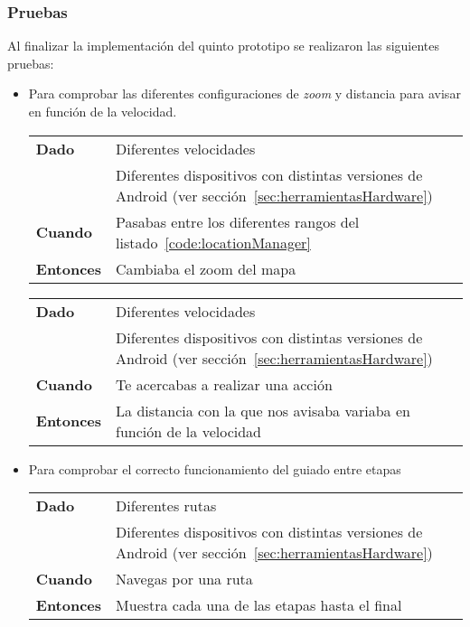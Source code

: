 \subsubsection{Pruebas}

Al finalizar la implementación del quinto prototipo se realizaron las siguientes pruebas:

\begin{itemize}
  \item Para comprobar las diferentes configuraciones de \emph{zoom} y distancia para avisar en
    función de la velocidad.

  \begin{tabular}{p{}p{}}
    \hline
    \textbf{Dado}     & Diferentes velocidades \\
                      & Diferentes dispositivos con distintas versiones de Android (ver
                        sección~\ref{sec:herramientasHardware}) \\
    \textbf{Cuando}   & Pasabas entre los diferentes rangos del listado~\ref{code:locationManager}\\
    \textbf{Entonces} & Cambiaba el zoom del mapa \\
    \hline
  \end{tabular}

  \begin{tabular}{p{}p{}}
    \hline
    \textbf{Dado}     & Diferentes velocidades \\
                      & Diferentes dispositivos con distintas versiones de Android (ver
                        sección~\ref{sec:herramientasHardware}) \\
    \textbf{Cuando}   & Te acercabas a realizar una acción \\
    \textbf{Entonces} & La distancia con la que nos avisaba variaba en función de la velocidad \\
    \hline
  \end{tabular}

  \item Para comprobar el correcto funcionamiento del guiado entre etapas

  \begin{tabular}{p{}p{}}
    \hline
    \textbf{Dado}     & Diferentes rutas \\
                      & Diferentes dispositivos con distintas versiones de Android (ver
                        sección~\ref{sec:herramientasHardware}) \\
    \textbf{Cuando}   & Navegas por una ruta \\
    \textbf{Entonces} & Muestra cada una de las etapas hasta el final \\
    \hline
  \end{tabular}


\end{itemize}
